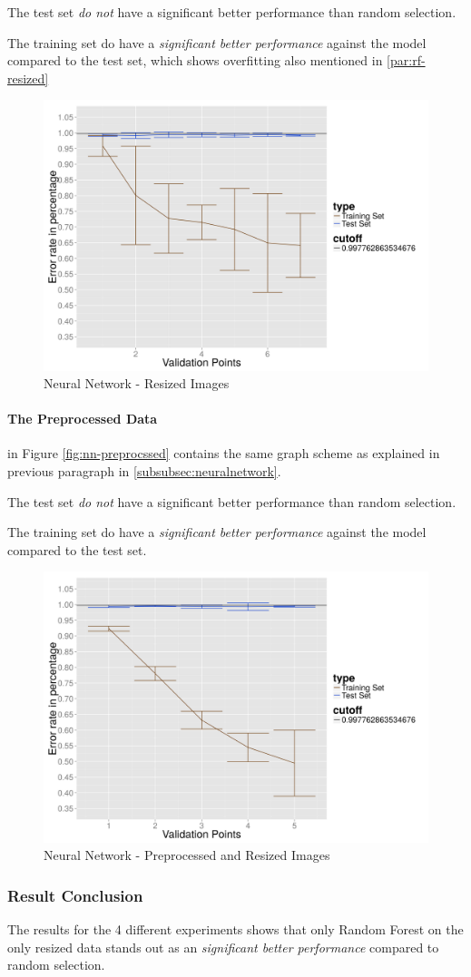 The test set \emph{do not} have a significant better performance than random selection.

The training set do have a \emph{significant better performance} against the model compared to the test set, which shows overfitting also mentioned in \ref{par:rf-resized}

\begin{figure}
  \centering
  \includegraphics[width=0.9\linewidth]{Images/DNNraw}
  \caption{Neural Network - Resized Images}
  \label{fig:nn-resized}
\end{figure}

\paragraph{The Preprocessed Data}
in Figure \ref{fig:nn-preprocssed} contains the same graph scheme as explained in previous paragraph in \ref{subsubsec:neuralnetwork}. 

The test set \emph{do not} have a significant better performance than random selection.

The training set do have a \emph{significant better performance} against the model compared to the test set.

\begin{figure}
  \centering
  \includegraphics[width=0.9\linewidth]{Images/DNNpreprocessed}
  \caption{Neural Network - Preprocessed and Resized Images}
  \label{fig:nn-preprocessed}
\end{figure}

\subsubsection{Result Conclusion}
The results for the 4 different experiments shows that only Random Forest on the only resized data stands out as an \emph{significant better performance} compared to random selection.

\label{subsec:evaluation}
